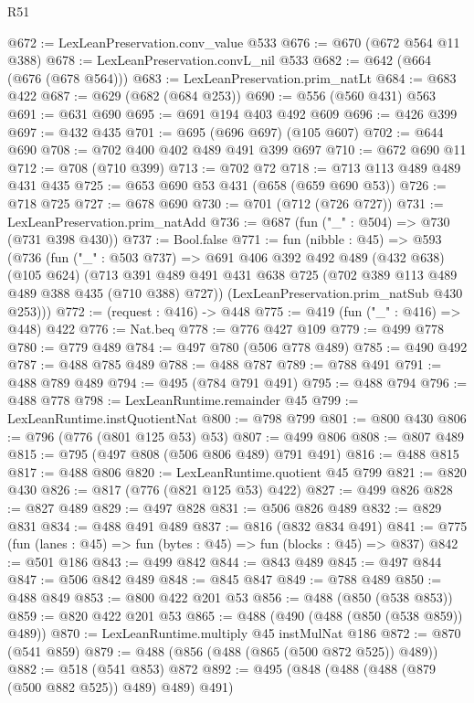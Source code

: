 \begin{lexlean}{R51}
\begin{coremodule}
@672 := LexLeanPreservation.conv_value @533
@676 := @670 (@672 @564 @11 @388)
@678 := LexLeanPreservation.convL_nil @533
@682 := @642 (@664 (@676 (@678 @564)))
@683 := LexLeanPreservation.prim_natLt
@684 := @683 @422
@687 := @629 (@682 (@684 @253))
@690 := @556 (@560 @431) @563
@691 := @631 @690
@695 := @691 @194 @403 @492 @609
@696 := @426 @399
@697 := @432 @435
@701 := @695 (@696 @697) (@105 @607)
@702 := @644 @690
@708 := @702 @400 @402 @489 @491 @399 @697
@710 := @672 @690 @11
@712 := @708 (@710 @399)
@713 := @702 @72
@718 := @713 @113 @489 @489 @431 @435
@725 := @653 @690 @53 @431 (@658 (@659 @690 @53))
@726 := @718 @725
@727 := @678 @690
@730 := @701 (@712 (@726 @727))
@731 := LexLeanPreservation.prim_natAdd
@736 := @687 (fun ("_" : @504) => @730 (@731 @398 @430))
@737 := Bool.false
@771 := fun (nibble : @45) =>
  @593
    (@736
      (fun ("_" : @503 @737) =>
      @691
        @406
        @392
        @492
        @489
        (@432 @638)
        (@105 @624)
        (@713 @391 @489 @491 @431 @638 @725 (@702 @389 @113 @489 @489 @388 @435 (@710 @388) @727))
        (LexLeanPreservation.prim_natSub @430 @253)))
@772 := (request : @416) -> @448
@775 := @419 (fun ("_" : @416) => @448) @422
@776 := Nat.beq
@778 := @776 @427 @109
@779 := @499 @778
@780 := @779 @489
@784 := @497 @780 (@506 @778 @489)
@785 := @490 @492
@787 := @488 @785 @489
@788 := @488 @787
@789 := @788 @491
@791 := @488 @789 @489
@794 := @495 (@784 @791 @491)
@795 := @488 @794
@796 := @488 @778
@798 := LexLeanRuntime.remainder @45
@799 := LexLeanRuntime.instQuotientNat
@800 := @798 @799
@801 := @800 @430
@806 := @796 (@776 (@801 @125 @53) @53)
@807 := @499 @806
@808 := @807 @489
@815 := @795 (@497 @808 (@506 @806 @489) @791 @491)
@816 := @488 @815
@817 := @488 @806
@820 := LexLeanRuntime.quotient @45 @799
@821 := @820 @430
@826 := @817 (@776 (@821 @125 @53) @422)
@827 := @499 @826
@828 := @827 @489
@829 := @497 @828
@831 := @506 @826 @489
@832 := @829 @831
@834 := @488 @491 @489
@837 := @816 (@832 @834 @491)
@841 := @775 (fun (lanes : @45) => fun (bytes : @45) => fun (blocks : @45) => @837)
@842 := @501 @186
@843 := @499 @842
@844 := @843 @489
@845 := @497 @844
@847 := @506 @842 @489
@848 := @845 @847
@849 := @788 @489
@850 := @488 @849
@853 := @800 @422 @201 @53
@856 := @488 (@850 (@538 @853))
@859 := @820 @422 @201 @53
@865 := @488 (@490 (@488 (@850 (@538 @859)) @489))
@870 := LexLeanRuntime.multiply @45 instMulNat @186
@872 := @870 (@541 @859)
@879 := @488 (@856 (@488 (@865 (@500 @872 @525)) @489))
@882 := @518 (@541 @853) @872
@892 := @495 (@848 (@488 (@488 (@879 (@500 @882 @525)) @489) @489) @491)

\end{coremodule}
\end{lexlean}
